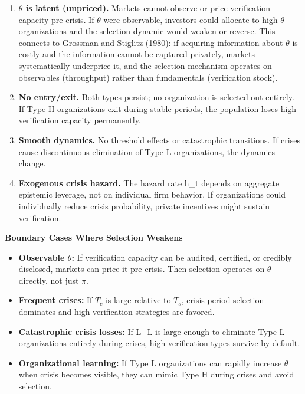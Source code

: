 \documentclass[11pt,a4paper]{article}
\providecommand{\tightlist}{\setlength{\itemsep}{0pt}\setlength{\parskip}{0pt}}
\begin{document}
\begin{enumerate}
\def\labelenumi{\arabic{enumi}.}
\tightlist
\item
  \textbf{$\theta$ is latent (unpriced).} Markets cannot observe or price verification capacity pre-crisis. If $\theta$ were observable, investors could allocate to high-$\theta$ organizations and the selection dynamic would weaken or reverse. This connects to Grossman and Stiglitz (1980): if acquiring information about $\theta$ is costly and the information cannot be captured privately, markets systematically underprice it, and the selection mechanism operates on observables (throughput) rather than fundamentals (verification stock).
\item
  \textbf{No entry/exit.} Both types persist; no organization is selected out entirely. If Type H organizations exit during stable periods, the population loses high-verification capacity permanently.
\item
  \textbf{Smooth dynamics.} No threshold effects or catastrophic transitions. If crises cause discontinuous elimination of Type L organizations, the dynamics change.
\item
  \textbf{Exogenous crisis hazard.} The hazard rate h\_t depends on aggregate epistemic leverage, not on individual firm behavior. If organizations could individually reduce crisis probability, private incentives might sustain verification.
\end{enumerate}

\textbf{Boundary Cases Where Selection Weakens}

\begin{itemize}
\tightlist
\item
  \textbf{Observable $\theta$:} If verification capacity can be audited, certified, or credibly disclosed, markets can price it pre-crisis. Then selection operates on $\theta$ directly, not just $\pi$.
\item
  \textbf{Frequent crises:} If $T_c$ is large relative to $T_s$, crisis-period selection dominates and high-verification strategies are favored.
\item
  \textbf{Catastrophic crisis losses:} If L\_L is large enough to eliminate Type L organizations entirely during crises, high-verification types survive by default.
\item
  \textbf{Organizational learning:} If Type L organizations can rapidly increase $\theta$ when crisis becomes visible, they can mimic Type H during crises and avoid selection.
\end{itemize}
\end{document}
